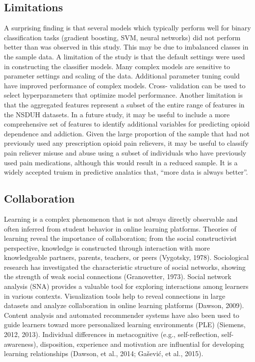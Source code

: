 \documentclass[sigconf]{acmart}
\begin{document}

\subsection{Limitations}

A surprising finding is that several models which typically perform well for 
binary classification tasks (gradient boosting, SVM, neural networks) did not 
perform better than was observed in this study. This may be due to imbalanced 
classes in the sample data. A limitation of the study is that the default 
settings were used in constructing the classifier models. Many complex models 
are sensitive to parameter settings and scaling of the data. Additional 
parameter tuning could have improved performance of complex models. Cross-
validation can be used to select hyperparameters that optimize model 
performance. Another limitation is that the aggregated features represent a 
subset of the entire range of features in the NSDUH datasets. In a future 
study, it may be useful to include a more comprehensive set of features to 
identify additional variables for predicting opioid dependence and addiction. 
Given the large proportion of the sample that had not previously used any
prescription opioid pain relievers, it may be useful to classify pain reliever 
misuse and abuse using a subset of individuals who have previously used pain 
medications, although this would result in a reduced sample. It is a widely
accepted truism in predictive analatics that, ``more data is always better''. 


\subsection{Collaboration}

Learning is a complex phenomenon that is not always directly observable and 
often inferred from student behavior in online learning platforms. Theories of 
learning reveal the importance of collaboration; from the social constructivist 
perspective, knowledge is constructed through interaction with more knowledgeable
partners, parents, teachers, or peers (Vygotsky, 1978). Sociological research
has investigated the characteristic structure of social networks, showing the 
strength of weak social connections (Granovetter, 1973). Social network analysis 
(SNA) provides a valuable tool for exploring interactions among learners in 
various contexts. Visualization tools help to reveal connections in large 
datasets and analyze collaboration in online learning platforms (Dawson, 2009). 
Content analysis and automated recommender systems have also been used to guide 
learners toward more personalized learning environments (PLE) (Siemens, 2012, 2013). 
Individual differences in metacognitive (e.g., self-reflection, self-awareness), 
disposition, experience and motivation are influential for developing learning 
relationships (Dawson, et al., 2014; Gašević, et al., 2015). 
\end{document}
